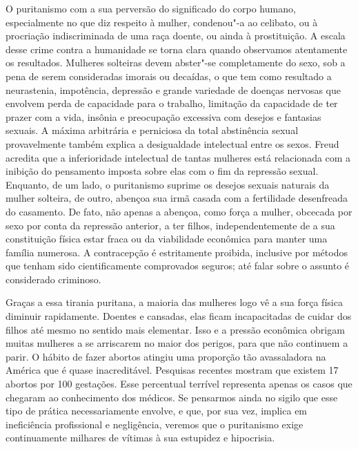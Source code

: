 O puritanismo com a sua perversão do significado do corpo humano,
especialmente no que diz respeito à mulher, condenou"-a ao celibato, ou à
procriação indiscriminada de uma raça doente, ou ainda à prostituição. A
escala desse crime contra a humanidade se torna clara quando observamos
atentamente os resultados. Mulheres solteiras devem abster"-se
completamente do sexo, sob a pena de serem consideradas imorais ou
decaídas, o que tem como resultado a neurastenia, impotência, depressão
e grande variedade de doenças nervosas que envolvem perda de capacidade
para o trabalho, limitação da capacidade de ter prazer com a vida,
insônia e preocupação excessiva com desejos e fantasias sexuais. A
máxima arbitrária e perniciosa da total abstinência sexual provavelmente
também explica a desigualdade intelectual entre os sexos. Freud acredita
que a inferioridade intelectual de tantas mulheres está relacionada com
a inibição do pensamento imposta sobre elas com o fim da repressão
sexual. Enquanto, de um lado, o puritanismo suprime os desejos sexuais
naturais da mulher solteira, de outro, abençoa sua irmã casada com a
fertilidade desenfreada do casamento. De fato, não apenas a abençoa,
como força a mulher, obcecada por sexo por conta da repressão anterior,
a ter filhos, independentemente de a sua constituição física estar fraca
ou da viabilidade econômica para manter uma família numerosa. A
contracepção é estritamente proibida, inclusive por métodos que tenham
sido cientificamente comprovados seguros; até falar sobre o assunto é
considerado criminoso.

Graças a essa tirania puritana, a maioria das mulheres logo vê a sua
força física diminuir rapidamente. Doentes e cansadas, elas ficam
incapacitadas de cuidar dos filhos até mesmo no sentido mais elementar.
Isso e a pressão econômica obrigam muitas mulheres a se arriscarem no
maior dos perigos, para que não continuem a parir. O hábito de fazer
abortos atingiu uma proporção tão avassaladora na América que é quase
inacreditável. Pesquisas recentes mostram que existem 17 abortos por 100
gestações. Esse percentual terrível representa apenas os casos que
chegaram ao conhecimento dos médicos. Se pensarmos ainda no sigilo que
esse tipo de prática necessariamente envolve, e que, por sua vez, implica em %
ineficiência profissional e negligência, veremos que o puritanismo exige continuamente
milhares de vítimas à sua estupidez e hipocrisia.

